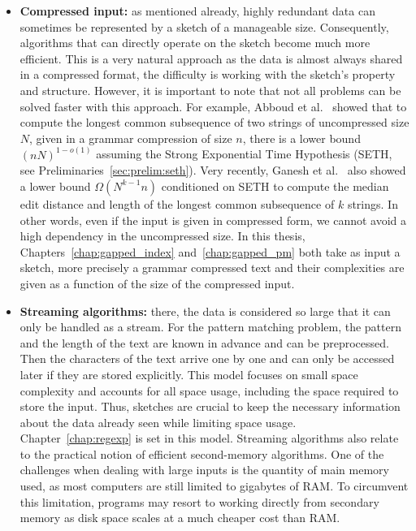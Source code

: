 \begin{itemize}
\item \textbf{Compressed input:} as mentioned already, highly redundant data can sometimes be represented by a sketch of a manageable size. 
Consequently, algorithms that can directly operate on the sketch become much more efficient. This is a very natural approach as the data is almost always shared in a compressed format, the difficulty is working with the sketch's property and structure. However, it is important to note that not all problems can be solved faster with this approach. For example, Abboud et al.~\cite{abboud2017fine} showed that to compute the longest common subsequence of two strings of uncompressed size $N$, given in a grammar compression of size $n$, there is a lower bound $(nN)^{1-o(1)}$ assuming the Strong Exponential Time Hypothesis (SETH, see Preliminaries~\ref{sec:prelim:seth}). 
Very recently, Ganesh et al.~\cite{ganesh2022compression} also showed a lower bound $\Omega(N^{k-1}n)$ conditioned on SETH to compute the median edit distance and length of the longest common subsequence of $k$ strings.
In other words, even if the input is given in compressed form, we cannot avoid a high dependency in the uncompressed size. In this thesis, Chapters~\ref{chap:gapped_index} and~\ref{chap:gapped_pm} both take as input a sketch, more precisely a grammar compressed text and their complexities are given as a function of the size of the compressed input.
%
\item \textbf{Streaming algorithms:} there, the data is considered so large that it can only be handled as a stream. %
For the pattern matching problem, the pattern and the length of the text are known in advance and can be preprocessed. Then the characters of the text arrive one by one and can only be accessed later if they are stored explicitly. 
This model focuses on small space complexity and accounts for all space usage, including the space required to store the input.
Thus, sketches are crucial to keep the necessary information about the data already seen while limiting space usage.
Chapter~\ref{chap:regexp} is set in this model. %
Streaming algorithms also relate to the practical notion of efficient second-memory algorithms. One of the challenges when dealing with large inputs is the quantity of main memory used, as most computers are still limited to gigabytes of RAM. To circumvent this limitation, programs may resort to working directly from secondary memory as disk space scales at a much cheaper cost than RAM.

\end{itemize}
